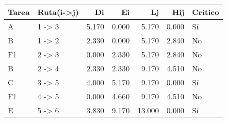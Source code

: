 \begin{tabular}{llrrrrl}
\toprule
Tarea & Ruta(i->j) & Di & Ei & Lj & Hij & Critico \\
\midrule
A & 1 -> 3 & 5.170 & 0.000 & 5.170 & 0.000 & Sí \\
B & 1 -> 2 & 2.330 & 0.000 & 5.170 & 2.840 & No \\
F1 & 2 -> 3 & 0.000 & 2.330 & 5.170 & 2.840 & No \\
B & 2 -> 4 & 2.330 & 2.330 & 9.170 & 4.510 & No \\
C & 3 -> 5 & 4.000 & 5.170 & 9.170 & 0.000 & Sí \\
F1 & 4 -> 5 & 0.000 & 4.660 & 9.170 & 4.510 & No \\
E & 5 -> 6 & 3.830 & 9.170 & 13.000 & 0.000 & Sí \\
\bottomrule
\end{tabular}
